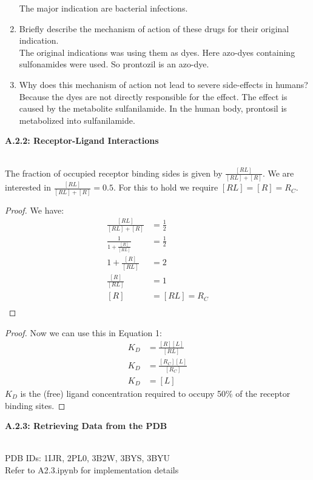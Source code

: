 \documentclass[a4paper,10pt]{article}
\begin{document}
\begin{enumerate}
    The major indication are bacterial infections. 
    \item Briefly describe the mechanism of action of these drugs for their original indication. \\
    The original indications was using them as dyes. Here azo-dyes containing sulfonamides were used. So prontozil is an azo-dye.
    \item Why does this mechanism of action not lead to severe side-effects in humans? \\
    Because the dyes are not directly responsible for the effect. The effect is caused by the metabolite sulfanilamide. In the human body, prontosil is metabolized into sulfanilamide. 
\end{enumerate}


\begin{large}
	\vspace{1.0cm}
	\textbf{A.2.2: Receptor-Ligand Interactions}
\end{large}	\\ [2mm]


The fraction of occupied receptor binding sides is given by $\frac{[RL]}{[RL]+ [R]}$. We are interested in $\frac{[RL]}{[RL]+ [R]} = 0.5$. For this to hold we require $[RL] = [R] = R_C$.
\begin{proof}
We have:
\begin{align*}
\frac{[RL]}{[RL]+ [R]} &= \frac{1}{2} \\
         \frac{1}{1 +\frac{[R]}{[RL]}} &= \frac{1}{2}  \\
         1 +\frac{[R]}{[RL]} &= 2  \\
         \frac{[R]}{[RL]} &= 1  \\
         [R] &= [RL]  = R_C\\
\end{align*}
\end{proof}
\begin{proof}
Now we can use this in Equation 1:
\begin{align*}
K_D& = \frac{[R][L]}{[RL]} \\
K_D &= \frac{[R_C][L]}{[R_C]} \\
         K_D &= [L]
\end{align*}
$K_D$ is the (free) ligand concentration required to occupy 50\% of the receptor binding sites.
\end{proof}


\begin{large}
	\vspace{1.0cm}
	\textbf{A.2.3: Retrieving Data from the PDB}
\end{large}	\\ [2mm]


PDB IDs: 1IJR, 2PL0, 3B2W, 3BYS, 3BYU \\
Refer to A2.3.ipynb for implementation details



\end{document}

